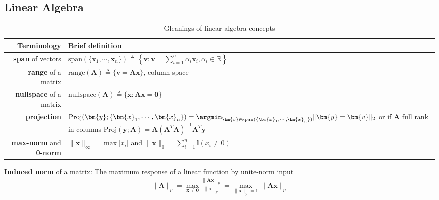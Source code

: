 


\setcounter{subsection}{6}
\subsection{Linear Algebra}

\begin{table}[htpb]
    \centering
    \begin{tabular}{rp{32em}}
        \toprule
        Terminology & Brief definition\\
        \midrule
        \textbf{span} of vectors &  $\text{span}(\{\bm{x}_1,\cdots,\bm{x}_n\})\triangleq\left\{\bm{v}:\bm{v}=\sum_{i=1}^n\alpha_i\bm{x}_i,\alpha_i\in\mathbb{R}\right\}$\\
        \textbf{range} of a matrix & $\text{range}(\mathbf{A})\triangleq\{\bm{v}=\mathbf{A}\bm{x}\}$, column space \\ 
        \textbf{nullspace} of a matrix & $\text{nullspace}(\mathbf{A})\triangleq{\{\bm{x}:\mathbf{A}\bm{x}=\bm{0}\}}$\\
        \textbf{projection} & $\text{Proj}(\bm{y};\{\bm{x}_1,\cdots,\bm{x}_n\})=\argmin_{\bm{v}\in\text{span}(\{\bm{x}_1,\cdots,\bm{x}_n\})}\|\bm{y}=\bm{v}\|_2$ 
        or if $\mathbf{A}$ full rank in columns $\text{Proj}(\bm{y};\mathbf{A})=\mathbf{A}(\mathbf{A}^T\mathbf{A})^{-1}\mathbf{A}^T\bm{y}$ \\
        \textbf{max-norm} and \textbf{0-norm} & $\|\bm{x}\|_\infty=\max|x_i|$ and $\|\bm{x}\|_0=\sum_{i=1}^n\mathbb{I}(x_i\neq 0)$\\
        \bottomrule
    \end{tabular}
    \caption{Gleanings of linear algebra concepts}
    \label{tab:linalgc}
\end{table}

\textbf{Induced norm} of a matrix:
The maximum response of a linear function by unite-norm input
\begin{gather}
    \|\mathbf{A}\|_p=\max_{\bm{x}\neq\bm{0}}\frac{\|\mathbf{A}\bm{x}\|_p}{\|\bm{x}\|_p}=\max_{\|\bm{x}\|_p=1}\|\mathbf{A}\bm{x}\|_p
\end{gather}


